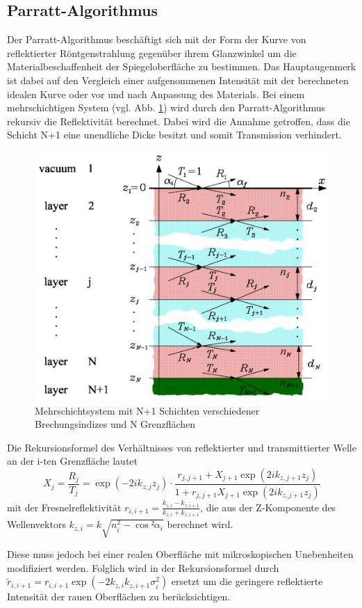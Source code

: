 \subsection{Parratt-Algorithmus}
Der Parratt-Algorithmus beschäftigt sich mit der Form der Kurve von reflektierter Röntgenstrahlung gegenüber ihrem Glanzwinkel um die Materialbeschaffenheit der Spiegeloberfläche zu bestimmen.
Das Hauptaugenmerk ist dabei auf den Vergleich einer aufgenommenen Intensität mit der berechneten idealen Kurve oder vor und nach Anpassung des Materials.
Bei einem mehrschichtigen System (vgl. Abb. \ref{fig:mehrschicht}) wird durch den Parratt-Algorithmus rekursiv die Reflektivität berechnet.
Dabei wird die Annahme getroffen, dass die Schicht N+1 eine unendliche Dicke besitzt und somit Transmission verhindert.
\begin{figure}
    \center
    \includegraphics[width=0.6\linewidth]{abb/mehrschicht.png}
    \caption{Mehrschichtsystem mit N+1 Schichten verschiedener Brechungsindizes und N Grenzflächen \cite{Stettner}}
    \label{fig:mehrschicht}
\end{figure}
Die Rekursionsformel des Verhältnisses von reflektierter und transmittierter Welle an der i-ten Grenzfläche lautet
\begin{equation}
    X_{j}=\frac{R_{j}}{T_{j}}=\exp \left(-2 i k_{z, j} z_{j}\right) \cdot \frac{r_{j, j+1}+X_{j+1} \exp \left(2 i k_{z, j+1} z_{j}\right)}{1+r_{j, j+1} X_{j+1} \exp \left(2 i k_{z, j+1} z_{j}\right)}
\end{equation}
mit der Fresnelreflektivität $r_{i,i+1} = \frac{k_{z,i}-k_{z,i+1}}{k_{z,i}+k_{z,i+1}}$, die aus der Z-Komponente des Wellenvektors $k_{z,i}=k\sqrt{n^2_i - \cos²\alpha_i}$ berechnet wird.

Diese muss jedoch bei einer realen Oberfläche mit mikroskopischen Unebenheiten modifiziert werden. Folglich wird in der
Rekursionsformel durch $\tilde{r}_{i, i+1}=r_{i, i+1} \exp \left(-2 k_{z, i} k_{z, i+1} \sigma_{i}^{2}\right)$ ersetzt um die geringere reflektierte
Intensität der rauen Oberflächen zu berücksichtigen.